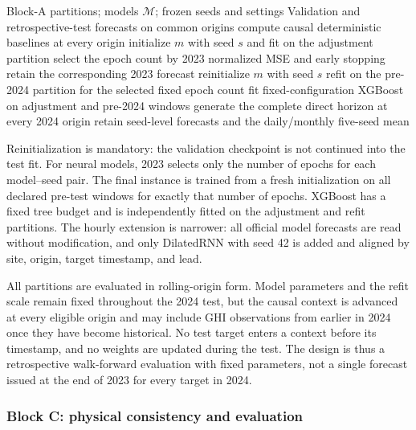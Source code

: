 \begin{algorithm}[!t]
\caption{Block B: validation, reinitialization, and direct forecasting}
\label{alg:block_b}
\begin{algorithmic}[1]
\Require Block-A partitions; models $\mathcal{M}$; frozen seeds and settings
\Ensure Validation and retrospective-test forecasts on common origins
\State compute causal deterministic baselines at every origin
    \State initialize $m$ with seed $s$ and fit on the adjustment partition
    \State select the epoch count by 2023 normalized MSE and early stopping
    \State retain the corresponding 2023 forecast
    \State reinitialize $m$ with seed $s$
    \State refit on the pre-2024 partition for the selected fixed epoch count
  \Else
    \State fit fixed-configuration XGBoost on adjustment and pre-2024 windows
  \EndIf
  \State generate the complete direct horizon at every 2024 origin
\EndFor
\State retain seed-level forecasts and the daily/monthly five-seed mean
\end{algorithmic}
\end{algorithm}

Reinitialization is mandatory: the validation checkpoint is not continued into
the test fit. For neural models, 2023 selects only the number of epochs for each
model--seed pair. The final instance is trained from a fresh initialization on
all declared pre-test windows for exactly that number of epochs. XGBoost has a
fixed tree budget and is independently fitted on the adjustment and refit
partitions. The hourly extension is narrower: all official model forecasts are
read without modification, and only DilatedRNN with seed 42 is added and
aligned by site, origin, target timestamp, and lead.

All partitions are evaluated in rolling-origin form. Model parameters and the
refit scale remain fixed throughout the 2024 test, but the causal context is
advanced at every eligible origin and may include GHI observations from earlier
in 2024 once they have become historical. No test target enters a context before
its timestamp, and no weights are updated during the test. The design is thus a
retrospective walk-forward evaluation with fixed parameters, not a single
forecast issued at the end of 2023 for every target in 2024.

\subsubsection{Block C: physical consistency and evaluation}

